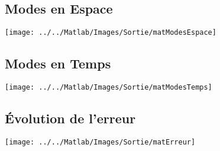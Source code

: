 \documentclass{article}
\begin{document}
\subsection*{Modes en Espace}
\texttt{[image: ../../Matlab/Images/Sortie/matModesEspace]}

\subsection*{Modes en Temps}
\texttt{[image: ../../Matlab/Images/Sortie/matModesTemps]}

\subsection*{Évolution de l'erreur}
\texttt{[image: ../../Matlab/Images/Sortie/matErreur]}
\end{document}
